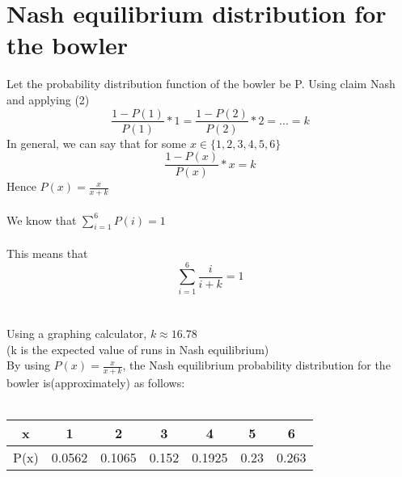 \documentclass{article}
\begin{document}
\section{Nash equilibrium distribution for the bowler}
Let the probability distribution function of the bowler be P.
Using claim Nash and applying (2)
$$\frac{1 - P(1)}{P(1)}*1 = \frac{1 - P(2)}{P(2)}*2 = ... = k$$
In general, we can say that for some $x \in \{1,2,3,4,5,6\}$
$$\frac{1 - P(x)}{P(x)}*x = k$$
Hence
$P(x) = \frac{x}{x + k}$
\\
\\
We know that $\sum_{i = 1}^6 P(i) = 1$
\\
\\
This means that \begin{equation}\sum_{i = 1}^6 \frac{i}{i + k} = 1\end{equation} 
\\
\\
Using a graphing calculator, $k \approx 16.78$
\\
(k is the expected value of runs in Nash equilibrium)
\\
By using $P(x) = \frac{x}{x + k}$, the Nash equilibrium probability distribution for the bowler is(approximately) as follows:
\\
\\
\begin{tabular}{|c|c|c|c|c|c|c|}
    \hline
    x & 1 & 2 & 3 & 4 & 5 & 6\\\hline
    P(x) & 0.0562 & 0.1065 & 0.152 & 0.1925 & 0.23 & 0.263\\\hline
\end{tabular}
\\
\end{document}

